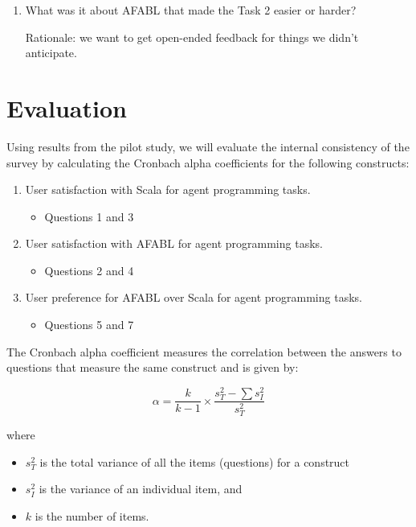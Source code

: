 \begin{appendices}
\begin{enumerate}
\item What was it about AFABL that made the Task 2 easier or harder?

Rationale: we want to get open-ended feedback for things we didn’t anticipate.

\end{enumerate}

\section{Evaluation}

Using results from the pilot study, we will evaluate the internal consistency of the survey by calculating the Cronbach alpha coefficients for the following constructs:

\begin{enumerate}

\item User satisfaction with Scala for agent programming tasks.
\begin{itemize}
\item Questions 1 and 3
\end{itemize}

\item User satisfaction with AFABL for agent programming tasks.
\begin{itemize}
\item  Questions 2 and 4
\end{itemize}

\item User preference for AFABL over Scala for agent programming tasks.
\begin{itemize}
\item Questions 5 and 7
\end{itemize}

\end{enumerate}

The Cronbach alpha coefficient measures the correlation between the answers to questions that measure the same construct and is given by:

\[
\alpha = \frac{k}{k - 1} \times \frac{s_{T}^{2} - \sum s_{I}^{2}}{s_{T}^{2}}
\]

where
\begin{itemize}
\item $s_T^2$ is the total variance of all the items (questions) for a construct
\item $s_I^2$ is the variance of an individual item, and
\item $k$ is the number of items.
\end{itemize}


\end{appendices}
